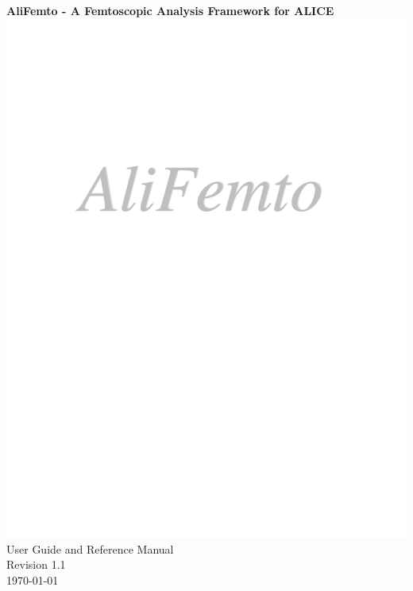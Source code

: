 \documentclass[twoside]{article}
\newcommand {\DocumentVersionNumber} {1.1}  %
\begin{document}
%
%
\begin{titlepage}
\pagestyle{empty}
\vspace*{-35mm}
\begin{center}
  {\Large\bf AliFemto - A Femtoscopic Analysis Framework for ALICE}
  \hfill\mbox{}\\[4.5cm]
\mbox{\includegraphics[width=\textwidth]{AliFemtoTitle.pdf}}
  \hfill\mbox{}\\[8cm]
  {\LARGE User Guide and Reference Manual}\\[2cm]
  {\LARGE Revision \DocumentVersionNumber}  \\[5mm] 
  {\LARGE \today}  %
  \vfill
\end{center}
\cleardoublepage
\end{titlepage}

%
%
\tableofcontents
\clearpage
\end{document}
